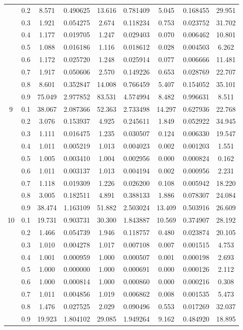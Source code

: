 \begin{longtable}{ | c | c || c | c | c | c | c | c | c | }
 & 0.2 & 8.571 & 0.490625 & 13.616 & 0.781409 & 5.045 & 0.168455 & 29.951 \\
 & 0.3 & 1.921 & 0.054275 & 2.674 & 0.118234 & 0.753 & 0.023752 & 31.702 \\
 & 0.4 & 1.177 & 0.019705 & 1.247 & 0.029403 & 0.070 & 0.006462 & 10.801 \\
 & 0.5 & 1.088 & 0.016186 & 1.116 & 0.018612 & 0.028 & 0.004503 & 6.262 \\
 & 0.6 & 1.172 & 0.025720 & 1.248 & 0.025914 & 0.077 & 0.006666 & 11.481 \\
 & 0.7 & 1.917 & 0.050606 & 2.570 & 0.149226 & 0.653 & 0.028769 & 22.707 \\
 & 0.8 & 8.601 & 0.352847 & 14.008 & 0.766459 & 5.407 & 0.154052 & 35.101 \\
 & 0.9 & 75.049 & 2.977852 & 83.531 & 4.574994 & 8.482 & 0.996631 & 8.511 \\
 \hline
\multirow{9}{*}{9} & 0.1 & 38.067 & 2.087366 & 52.363 & 2.733498 & 14.297 & 0.627936 & 22.768 \\
 & 0.2 & 3.076 & 0.153937 & 4.925 & 0.245611 & 1.849 & 0.052922 & 34.945 \\
 & 0.3 & 1.111 & 0.016475 & 1.235 & 0.030507 & 0.124 & 0.006330 & 19.547 \\
 & 0.4 & 1.011 & 0.005219 & 1.013 & 0.004023 & 0.002 & 0.001203 & 1.551 \\
 & 0.5 & 1.005 & 0.003410 & 1.004 & 0.002956 & 0.000 & 0.000824 & 0.162 \\
 & 0.6 & 1.011 & 0.003137 & 1.013 & 0.004194 & 0.002 & 0.000956 & 2.231 \\
 & 0.7 & 1.118 & 0.019309 & 1.226 & 0.026200 & 0.108 & 0.005942 & 18.220 \\
 & 0.8 & 3.005 & 0.182511 & 4.891 & 0.388133 & 1.886 & 0.078307 & 24.084 \\
 & 0.9 & 38.474 & 1.163109 & 51.882 & 2.503024 & 13.409 & 0.503916 & 26.609 \\
 \hline
\multirow{9}{*}{10} & 0.1 & 19.731 & 0.903731 & 30.300 & 1.843887 & 10.569 & 0.374907 & 28.192 \\
 & 0.2 & 1.466 & 0.054739 & 1.946 & 0.118757 & 0.480 & 0.023874 & 20.105 \\
 & 0.3 & 1.010 & 0.004278 & 1.017 & 0.007108 & 0.007 & 0.001515 & 4.753 \\
 & 0.4 & 1.001 & 0.000959 & 1.000 & 0.000507 & 0.001 & 0.000198 & 2.693 \\
 & 0.5 & 1.000 & 0.000000 & 1.000 & 0.000691 & 0.000 & 0.000126 & 2.112 \\
 & 0.6 & 1.000 & 0.000814 & 1.000 & 0.000860 & 0.000 & 0.000216 & 0.308 \\
 & 0.7 & 1.011 & 0.004856 & 1.019 & 0.006862 & 0.008 & 0.001535 & 5.473 \\
 & 0.8 & 1.476 & 0.027525 & 2.029 & 0.090496 & 0.553 & 0.017269 & 32.037 \\
 & 0.9 & 19.923 & 1.804102 & 29.085 & 1.949264 & 9.162 & 0.484920 & 18.895 \\
 \hline
\hline
\end{longtable}
 
